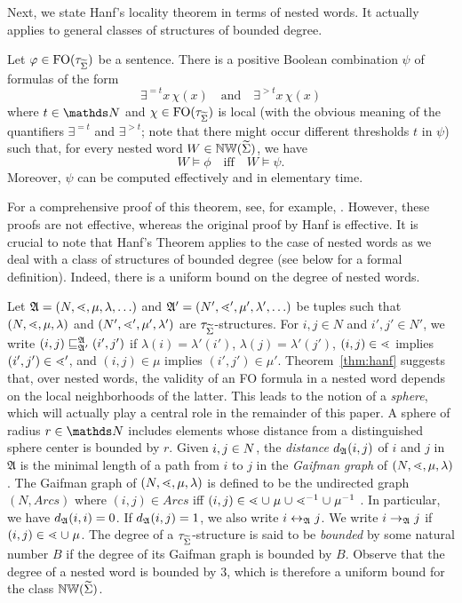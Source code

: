 \documentclass{LMCS}
\begin{document}
Next, we state Hanf's locality theorem in terms of nested words. It actually
applies to general classes of structures of bounded degree.

\begin{thm}\label{thm:hanf} Let $\phi \in
  \FO(\tau_{\crSigma})$ be a sentence. There is a positive Boolean combination
  $\psi$ of formulas of the form \[\exists^{=t}x\, \chi(x) \text{~~~and~~~}
  \exists^{>t}x\, \chi(x)\] where $t \in \N$ and $\chi \in
  \FO(\tau_{\crSigma})$ is local (with the obvious meaning of the quantifiers
  $\exists^{=t}$ and $\exists^{>t}$; note that there might occur different
  thresholds $t$ in $\psi$) such that, for every nested word $W \in
  \NW(\crSigma)$, we have
  \[W \models \phi \text{~~~iff~~~} W \models \psi.\] Moreover, $\psi$ can be
  computed effectively and in elementary time.
\end{thm}
For a comprehensive proof of this theorem, see, for example,
\cite{Tho97handbook,Libkin2004}. However, these proofs are not effective,
whereas the original proof by Hanf is effective. It is crucial to note that
Hanf's Theorem applies to the case of nested words as we deal with a class of
structures of bounded degree (see below for a formal definition). Indeed,
there is a uniform bound on the degree of nested words.

Let $\mathfrak{A}=(\Nat,\succord,\mu,\lambda,\ldots)$ and
$\mathfrak{A'}=(\Nat',\succord',\mu',\lambda',\ldots)$ be tuples such that
$(\Nat,\succord,\mu,\lambda)$ and $(\Nat',\succord',\mu',\lambda')$ are
$\signNW$-structures.
For $i,j \in N$ and $i',j' \in N'$, we write
$\wsimulate{\mathfrak{A}}{\mathfrak{A}'}{(i,j)}{(i',j')}$ if $\lambda(i) =
\lambda'(i')$, $\lambda(j) = \lambda'(j')$, $(i,j) \in \succord$ implies
$(i',j') \in \succord'$, and $(i,j) \in \mu$ implies $(i',j') \in \mu'$.
Theorem~\ref{thm:hanf} suggests that, over nested words, the validity of an FO
formula in a nested word depends on the local neighborhoods of the latter.
This leads to the notion of a \emph{sphere}, which will actually play a
central role in the remainder of this paper. A sphere of radius $r \in \N$
includes elements whose distance from a distinguished sphere center is bounded
by $r$. Given $i,j \in \Nat$, the \emph{distance} $\dist_\mathfrak{A}(i,j)$ of
$i$ and $j$ in $\mathfrak{A}$ is the minimal length of a path from $i$ to $j$
in the \emph{Gaifman graph} of $(\Nat,\succord,\mu,\lambda)$. The Gaifman
graph of $(\Nat,\succord,\mu,\lambda)$ is defined to be the undirected graph
$(N,\mathit{Arcs})$ where $(i,j) \in \mathit{Arcs}$ iff $(i,j) \in \succord
\mathrel{\cup} \mathord{\mu} \mathrel{\cup} \succord^{-1} \mathrel{\cup}
\mathord{\mu}^{-1}$ \cite{Libkin2004}. In particular, we have
$\dist_\mathfrak{A}(i,i) = 0$. If $\dist_\mathfrak{A}(i,j) = 1$, we also write
$i \edge{\mathfrak{A}} j$. We write $i \redge{\mathfrak{A}} j$ if $(i,j) \in
\succord \mathrel{\cup} \mu$.
The degree of a $\signNW$-structure is said to be \emph{bounded} by some
natural number $B$ if the degree of its Gaifman graph is bounded by $B$.
Observe that the degree of a nested word is bounded by $3$, which is therefore
a uniform bound for the class $\NW(\crSigma)$.
\end{document}
